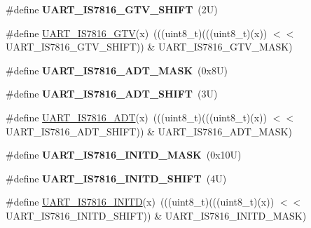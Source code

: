 \begin{DoxyCompactItemize}
\#define {\bfseries U\+A\+R\+T\+\_\+\+I\+S7816\+\_\+\+G\+T\+V\+\_\+\+S\+H\+I\+FT}~(2\+U)
\item 
\#define \mbox{\hyperlink{group___u_a_r_t___register___masks_ga5ab2b6e3feea53f32153dbca3f56dbc5}{U\+A\+R\+T\+\_\+\+I\+S7816\+\_\+\+G\+TV}}(x)~(((uint8\+\_\+t)(((uint8\+\_\+t)(x)) $<$$<$ U\+A\+R\+T\+\_\+\+I\+S7816\+\_\+\+G\+T\+V\+\_\+\+S\+H\+I\+FT)) \& U\+A\+R\+T\+\_\+\+I\+S7816\+\_\+\+G\+T\+V\+\_\+\+M\+A\+SK)
\item 
\mbox{\label{group___u_a_r_t___register___masks_ga728d8301ea0592fc8f21c5f3e1a0b8c8}} 
\#define {\bfseries U\+A\+R\+T\+\_\+\+I\+S7816\+\_\+\+A\+D\+T\+\_\+\+M\+A\+SK}~(0x8\+U)
\item 
\mbox{\label{group___u_a_r_t___register___masks_gad62ca467688c22ce934e0060b18b2241}} 
\#define {\bfseries U\+A\+R\+T\+\_\+\+I\+S7816\+\_\+\+A\+D\+T\+\_\+\+S\+H\+I\+FT}~(3\+U)
\item 
\#define \mbox{\hyperlink{group___u_a_r_t___register___masks_ga1aac9c296b1be00fb8648f738ca5855f}{U\+A\+R\+T\+\_\+\+I\+S7816\+\_\+\+A\+DT}}(x)~(((uint8\+\_\+t)(((uint8\+\_\+t)(x)) $<$$<$ U\+A\+R\+T\+\_\+\+I\+S7816\+\_\+\+A\+D\+T\+\_\+\+S\+H\+I\+FT)) \& U\+A\+R\+T\+\_\+\+I\+S7816\+\_\+\+A\+D\+T\+\_\+\+M\+A\+SK)
\item 
\mbox{\label{group___u_a_r_t___register___masks_ga48d3ed5c444bdfed8d0baa49bd44d1c2}} 
\#define {\bfseries U\+A\+R\+T\+\_\+\+I\+S7816\+\_\+\+I\+N\+I\+T\+D\+\_\+\+M\+A\+SK}~(0x10\+U)
\item 
\mbox{\label{group___u_a_r_t___register___masks_gaf36d718f5eb5c052b7670168d8b429b1}} 
\#define {\bfseries U\+A\+R\+T\+\_\+\+I\+S7816\+\_\+\+I\+N\+I\+T\+D\+\_\+\+S\+H\+I\+FT}~(4\+U)
\item 
\#define \mbox{\hyperlink{group___u_a_r_t___register___masks_ga6cb4bb7d090cf81948ed5b7b36dd4ca1}{U\+A\+R\+T\+\_\+\+I\+S7816\+\_\+\+I\+N\+I\+TD}}(x)~(((uint8\+\_\+t)(((uint8\+\_\+t)(x)) $<$$<$ U\+A\+R\+T\+\_\+\+I\+S7816\+\_\+\+I\+N\+I\+T\+D\+\_\+\+S\+H\+I\+FT)) \& U\+A\+R\+T\+\_\+\+I\+S7816\+\_\+\+I\+N\+I\+T\+D\+\_\+\+M\+A\+SK)
\item 
\mbox{\label{group___u_a_r_t___register___masks_gab2edbcc850e211bdeadca83910170e5a}} 
$$
\end{DoxyCompactItemize}
